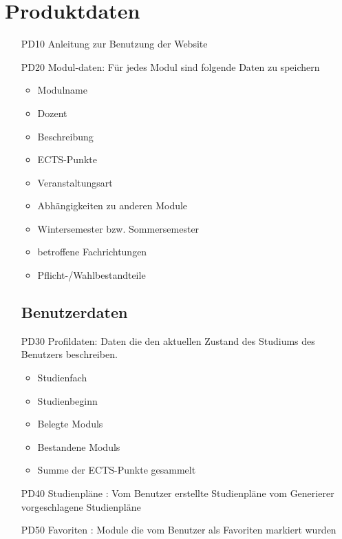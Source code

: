 \section{Produktdaten}
	\begin{itemize}[nosep]
	\subsection{Systemdaten}
	\item[PD10]Anleitung zur Benutzung der 		Website
	\item[PD20] \gls{Modul}-daten: Für jedes \gls{Modul} sind folgende Daten zu speichern	
	\begin{itemize}
	\item Modulname
	\item Dozent
	\item Beschreibung
	\item \gls{ECTS-Punkte}
	\item Veranstaltungsart
	\item Abhängigkeiten zu anderen \gls{Module}
	\item Wintersemester bzw. Sommersemester
	\item betroffene Fachrichtungen 
	\item Pflicht-/Wahlbestandteile
	\end{itemize}	 
	\subsection{Benutzerdaten}
	\item[PD30]Profildaten: Daten die den aktuellen Zustand des Studiums des Benutzers beschreiben.
		\begin{itemize}
		\item Studienfach
		\item Studienbeginn
		\item Belegte \glspl{Modul}
		\item Bestandene \glspl{Modul} 
		\item Summe der \gls{ECTS-Punkte} gesammelt
		\end{itemize}
\item[PD40]Studienpläne : 
	Vom Benutzer erstellte Studienpläne 
	vom \gls{Generierer} vorgeschlagene Studienpläne 
\item[PD50] Favoriten : Module die vom Benutzer als Favoriten markiert wurden
\end{itemize}